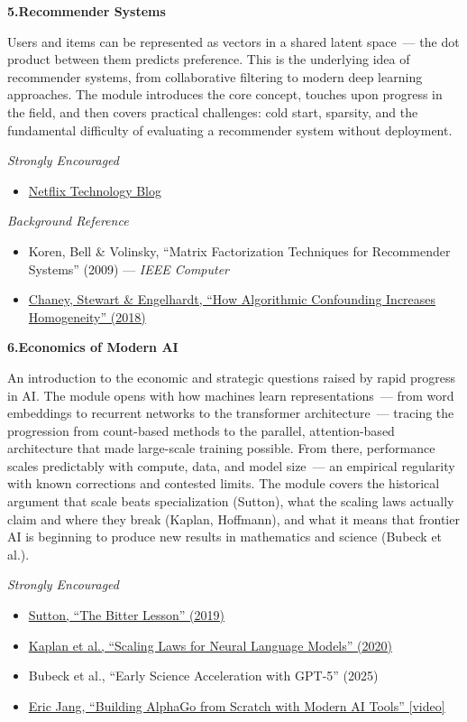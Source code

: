\documentclass[11pt]{article}
\newcommand{\module}[2]{%
  \vspace{10pt}%
  {\large\textbf{#1\quad #2}}%
  \vspace{4pt}%
  \newline%
}
\begin{document}
\bigskip

\module{5.}{Recommender Systems}

Users and items can be represented as vectors in a shared latent space~--- the dot product between them predicts preference. This is the underlying idea of recommender systems, from collaborative filtering to modern deep learning approaches. The module introduces the core concept, touches upon progress in the field, and then covers practical challenges: cold start, sparsity, and the fundamental difficulty of evaluating a recommender system without deployment.

\smallskip
\textit{Strongly Encouraged}
\begin{itemize}
  \item \href{https://netflixtechblog.medium.com}{Netflix Technology Blog}
\end{itemize}

\textit{Background Reference}
\begin{itemize}
  \item Koren, Bell \& Volinsky, ``Matrix Factorization Techniques for Recommender Systems'' (2009) --- \textit{IEEE Computer}
  \item \href{https://arxiv.org/abs/1710.11214}{Chaney, Stewart \& Engelhardt, ``How Algorithmic Confounding Increases Homogeneity'' (2018)}
\end{itemize}

\bigskip

\module{6.}{Economics of Modern AI}

An introduction to the economic and strategic questions raised by rapid progress in AI. The module opens with how machines learn representations~--- from word embeddings to recurrent networks to the transformer architecture~--- tracing the progression from count-based methods to the parallel, attention-based architecture that made large-scale training possible. From there, performance scales predictably with compute, data, and model size~--- an empirical regularity with known corrections and contested limits. The module covers the historical argument that scale beats specialization (Sutton), what the scaling laws actually claim and where they break (Kaplan, Hoffmann), and what it means that frontier AI is beginning to produce new results in mathematics and science (Bubeck et al.).

\smallskip
\textit{Strongly Encouraged}
\begin{itemize}
  \item \href{http://incompleteideas.net/IncIdeas/BitterLesson.html}{Sutton, ``The Bitter Lesson'' (2019)}
  \item \href{https://arxiv.org/abs/2001.08361}{Kaplan et al., ``Scaling Laws for Neural Language Models'' (2020)}
  \item Bubeck et al., ``Early Science Acceleration with GPT-5'' (2025)
  \item \href{https://www.youtube.com/watch?v=X_ZVSPcZhtw}{Eric Jang, ``Building AlphaGo from Scratch with Modern AI Tools'' [video]}
\end{itemize}
\end{document}
